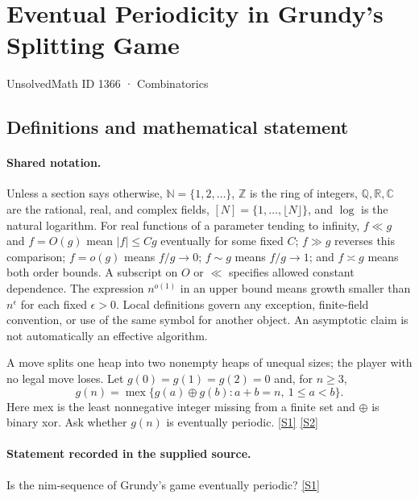\documentclass[11pt,a4paper]{article}
\newcommand{\N}{\mathbb{N}}
\newcommand{\Z}{\mathbb{Z}}
\newcommand{\Q}{\mathbb{Q}}
\newcommand{\R}{\mathbb{R}}
\newcommand{\C}{\mathbb{C}}
\newcommand{\sref}[2]{\hyperlink{source:#1:#2}{[S#2]}}
\begin{document}

\setcounter{section}{1365}

\section{Eventual Periodicity in Grundy’s Splitting Game}\label{1366}

{\small\sffamily UnsolvedMath ID 1366 · Combinatorics}

\subsection{Definitions and mathematical statement}

\paragraph{Shared notation.}Unless a section says otherwise, $\N=\{1,2,\ldots\}$,
$\Z$ is the ring of integers, $\Q,\R,\C$ are the rational, real, and complex
fields, $[N]=\{1,\ldots,\lfloor N\rfloor\}$, and $\log$ is the natural
logarithm. For real functions of a parameter tending to infinity,
$f\ll g$ and $f=O(g)$ mean $|f|\leq Cg$ eventually for some fixed $C$;
$f\gg g$ reverses this comparison; $f=o(g)$ means $f/g\to0$;
$f\sim g$ means $f/g\to1$; and $f\asymp g$ means both order bounds.
A subscript on $O$ or $\ll$ specifies allowed constant dependence.
The expression $n^{o(1)}$ in an upper bound means growth smaller than
$n^\epsilon$ for each fixed $\epsilon>0$. Local definitions govern any
exception, finite-field convention, or use of the same symbol for another
object. An asymptotic claim is not automatically an effective algorithm.



A move splits one heap into two nonempty heaps of unequal sizes; the player with no legal move loses. Let $g(0)=g(1)=g(2)=0$ and, for $n\geq3$,
\[g(n)=\operatorname{mex}\{g(a)\oplus g(b):a+b=n,\ 1\leq a<b\}.\]
Here mex is the least nonnegative integer missing from a finite set and $\oplus$ is binary xor. Ask whether $g(n)$ is eventually periodic. \sref{1366}{1} \sref{1366}{2}

\paragraph{Statement recorded in the supplied source.}
Is the nim-sequence of Grundy's game eventually periodic? \sref{1366}{1}
\end{document}
